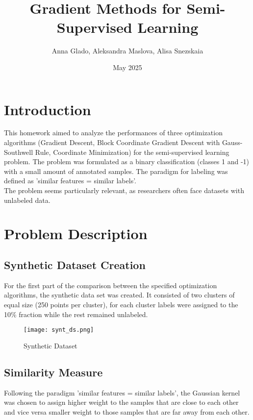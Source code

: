 \documentclass{article}
\title{Gradient Methods for Semi-Supervised Learning}
\author{Anna Glado, Aleksandra Maslova, Alisa Snezskaia}
\date{May 2025}
\begin{document}
\maketitle

\clearpage
\tableofcontents
\clearpage

\section{Introduction}
This homework aimed to analyze the performances of three optimization algorithms (Gradient Descent, Block Coordinate Gradient Descent with Gauss-Southwell Rule, Coordinate Minimization) for the semi-supervised learning problem. The problem was formulated as a binary classification (classes 1 and -1) with a small amount of annotated samples. The paradigm for labeling was defined as 'similar features = similar labels'. \\

\noindent The problem seems particularly relevant, as researchers often face datasets with unlabeled data. 

\section{Problem Description}
\subsection{Synthetic Dataset Creation}
For the first part of the comparison between the specified optimization algorithms, the synthetic data set was created. It consisted of two clusters of equal size (250 points per cluster), for each cluster labels were assigned to the 10\% fraction while the rest remained unlabeled.

\begin{figure}[h]
    \centering
    \texttt{[image: synt\_ds.png]}
    \caption{Synthetic Dataset}
    \label{fig:my_image}
\end{figure}

\subsection{Similarity Measure}
Following the paradigm 'similar features = similar labels', the Gaussian kernel was chosen to assign higher weight to the samples that are close to each other and vice versa smaller weight to those samples that are far away from each other. 
\end{document}
